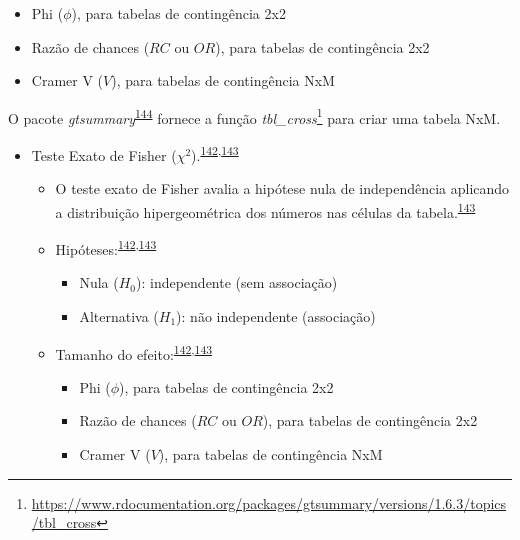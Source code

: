 \documentclass[
]{book}
\renewcommand{\href}[2]{#2\footnote{\url{#1}}}
\newenvironment{infobox}[1]
  {
  \begin{itemize}
  \renewcommand{\labelitemi}{
    \raisebox{-.7\height}[0pt][0pt]{
      {\setkeys{Gin}{width=3em,keepaspectratio}
        \texttt{[image: \#1]}}
    }
  }
  \setlength{\fboxsep}{1em}
  \begin{blackbox}
  \item
  }
  {
  \end{blackbox}
  \end{itemize}
  }
\begin{document}
\begin{itemize}
\begin{itemize}
    \begin{itemize}
    \item
      Phi (\(\phi\)), para tabelas de contingência 2x2
    \item
      Razão de chances (\(RC\) ou \(OR\)), para tabelas de contingência 2x2
    \item
      Cramer V (\(V\)), para tabelas de contingência NxM
    \end{itemize}
  \end{itemize}
\end{itemize}

\begin{infobox}{images/Rlogo}
O pacote \emph{gtsummary}\textsuperscript{\protect\hyperlink{ref-gtsummary}{144}} fornece a função \href{https://www.rdocumentation.org/packages/gtsummary/versions/1.6.3/topics/tbl_cross}{\emph{tbl\_cross}} para criar uma tabela NxM.

\end{infobox}

\begin{itemize}
\item
  Teste Exato de Fisher (\(\chi^2\)).\textsuperscript{\protect\hyperlink{ref-McHugh2013}{142},\protect\hyperlink{ref-Kim2017a}{143}}

  \begin{itemize}
  \item
    O teste exato de Fisher avalia a hipótese nula de independência aplicando a distribuição hipergeométrica dos números nas células da tabela.\textsuperscript{\protect\hyperlink{ref-Kim2017a}{143}}
  \item
    Hipóteses:\textsuperscript{\protect\hyperlink{ref-McHugh2013}{142},\protect\hyperlink{ref-Kim2017a}{143}}

    \begin{itemize}
    \item
      Nula (\(H_{0}\)): independente (sem associação)
    \item
      Alternativa (\(H_{1}\)): não independente (associação)
    \end{itemize}
  \item
    Tamanho do efeito:\textsuperscript{\protect\hyperlink{ref-McHugh2013}{142},\protect\hyperlink{ref-Kim2017a}{143}}

    \begin{itemize}
    \item
      Phi (\(\phi\)), para tabelas de contingência 2x2
    \item
      Razão de chances (\(RC\) ou \(OR\)), para tabelas de contingência 2x2
    \item
      Cramer V (\(V\)), para tabelas de contingência NxM
    \end{itemize}
  \end{itemize}
\end{itemize}
\end{document}

